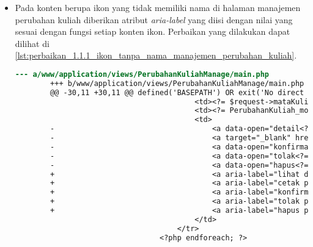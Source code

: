 \begin{itemize}
    \item Pada konten berupa ikon yang tidak memiliki nama di halaman manajemen perubahan kuliah diberikan atribut \textit{aria-label} yang diisi dengan nilai yang sesuai dengan fungsi setiap konten ikon. Perbaikan yang dilakukan dapat dilihat di \ref{lst:perbaikan_1.1.1_ikon_tanpa_nama_manajemen_perubahan_kuliah}.
    \begin{lstlisting}[frame=single, label={lst:perbaikan_1.1.1_ikon_tanpa_nama_manajemen_perubahan_kuliah}, language=diff, caption=Perbaikan Kriteria Sukses 1.1.1 - Ikon Tanpa Nama di Halaman Manajemen Perubahan Kuliah]
        --- a/www/application/views/PerubahanKuliahManage/main.php
        +++ b/www/application/views/PerubahanKuliahManage/main.php
        @@ -30,11 +30,11 @@ defined('BASEPATH') OR exit('No direct script access allowed');
                                         <td><?= $request->mataKuliahCode ?></td>
                                         <td><?= PerubahanKuliah_model::CHANGETYPE_TYPES[$request->changeType] ?></td>
                                         <td>
        -                                    <a data-open="detail<?= $request->id ?>"><i class="fi-eye"></i></a>
        -                                    <a target="_blank" href="/PerubahanKuliahManage/printview/<?= $request->id ?>"><i class="fi-print"></i></a>
        -                                    <a data-open="konfirmasi<?= $request->id ?>"><i class="fi-like"></i></a>                                    
        -                                    <a data-open="tolak<?= $request->id ?>"><i class="fi-dislike"></i></a>
        -                                    <a data-open="hapus<?= $request->id ?>"><i class="fi-trash"></i></a>
        +                                    <a aria-label="lihat detail permohonan" data-open="detail<?= $request->id ?>"><i class="fi-eye"></i></a>
        +                                    <a aria-label="cetak permohonan" target="_blank" href="/PerubahanKuliahManage/printview/<?= $request->id ?>"><i class="fi-print"></i></a>
        +                                    <a aria-label="konfirmasi permohonan" data-open="konfirmasi<?= $request->id ?>"><i class="fi-like"></i></a>                                    
        +                                    <a aria-label="tolak permohonan" data-open="tolak<?= $request->id ?>"><i class="fi-dislike"></i></a>
        +                                    <a aria-label="hapus permohonan" data-open="hapus<?= $request->id ?>"><i class="fi-trash"></i></a>
                                         </td>
                                     </tr>
                                 <?php endforeach; ?>
    \end{lstlisting}
\end{itemize}

